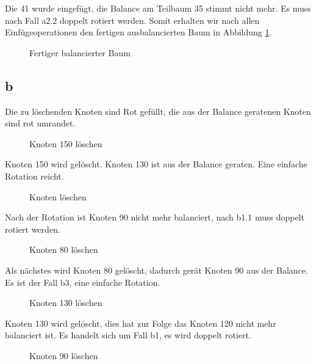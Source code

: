 \documentclass[12pt]{article}
\begin{document}
Die 41 wurde eingefügt, die Balance am Teilbaum 35 stimmt nicht mehr. Es muss nach Fall a2.2 doppelt
rotiert werden. Somit erhalten wir nach allen Einfügeoperationen den fertigen ausbalancierten
Baum in Abbildung \ref{fig:abb5b}.
\begin{figure}[h]
	\centering
	\scalebox{.5}{}
	\caption{Fertiger balancierter Baum}
	\label{fig:abb5b}
\end{figure}


\newpage

\subsection*{b}
Die zu löschenden Knoten sind Rot gefüllt, die aus der Balance geratenen Knoten sind
rot umrandet.

\begin{figure}[h]
	\centering
	\scalebox{.5}{}
	\caption{Knoten 150 löschen}
	\label{fig:abb6b}
\end{figure}
Knoten 150 wird gelöscht. Knoten 130 ist aus der Balance geraten. Eine einfache Rotation reicht.

\begin{figure}[h]
	\centering
	\scalebox{.5}{}
	\caption{Knoten  löschen}
	\label{fig:abb7b}
\end{figure}

Nach der Rotation ist Knoten 90 nicht mehr balanciert, nach b1.1 muss doppelt rotiert werden.

\begin{figure}[h]
	\centering
	\scalebox{.5}{}
	\caption{Knoten 80 löschen}
	\label{fig:abb8b}
\end{figure}

Als nächstes wird Knoten 80 gelöscht, dadurch gerät Knoten 90 aus der Balance. Es ist der
Fall b3, eine einfache Rotation.

\begin{figure}[h]
	\centering
	\scalebox{.5}{}
	\caption{Knoten 130 löschen}
	\label{fig:abb9b}
\end{figure}

\newpage

Knoten 130 wird gelöscht, dies hat zur Folge das Knoten 120 nicht mehr balanciert ist. Es handelt
sich um Fall b1, es wird doppelt rotiert.


\begin{figure}[h]
	\centering
	\scalebox{.5}{}
	\caption{Knoten 90 löschen}
	\label{fig:abb10b}
\end{figure}
\end{document}
